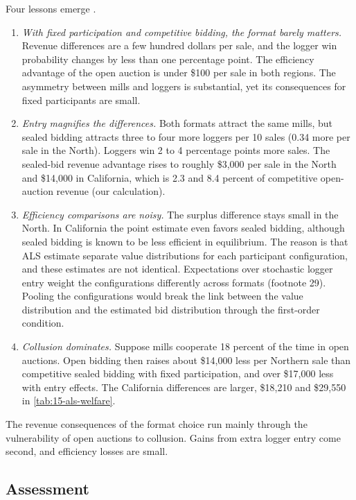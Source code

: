 Four lessons emerge \citep[pp.~253--255]{AtheyLevinSeira2011}.
\begin{enumerate}[label=(\roman*)]
\item \emph{With fixed participation and competitive bidding, the format barely matters.} Revenue
differences are a few hundred dollars per sale, and the logger win probability changes by less than one
percentage point. The efficiency advantage of the open auction is under \$100 per sale in both regions.
The asymmetry between mills and loggers is substantial, yet its consequences for fixed participants are
small.
\item \emph{Entry magnifies the differences.} Both formats attract the same mills, but sealed bidding
attracts three to four more loggers per 10 sales (0.34 more per sale in the North). Loggers win 2 to 4
percentage points more sales. The sealed-bid revenue advantage rises to roughly \$3,000 per sale in the
North and \$14,000 in California, which is 2.3 and 8.4 percent of competitive open-auction revenue (our
calculation).
\item \emph{Efficiency comparisons are noisy.} The surplus difference stays small in the North. In
California the point estimate even favors sealed bidding, although sealed bidding is known to be less
efficient in equilibrium. The reason is that ALS estimate separate value distributions for each
participant configuration, and these estimates are not identical. Expectations over stochastic logger
entry weight the configurations differently across formats (footnote 29). Pooling the configurations would
break the link between the value distribution and the estimated bid distribution through the first-order
condition.
\item \emph{Collusion dominates.} Suppose mills cooperate 18 percent of the time in open auctions. Open bidding
then raises about \$14,000 less per Northern sale than competitive sealed bidding with fixed participation,
and over \$17,000 less with entry effects. The California differences are larger, \$18,210 and \$29,550 in
\cref{tab:15-als-welfare}.
\end{enumerate}
The revenue consequences of the format choice run mainly through the vulnerability of open auctions to
collusion. Gains from extra logger entry come second, and efficiency losses are small.

\subsection{Assessment}\label{sec:15-als-assessment}

